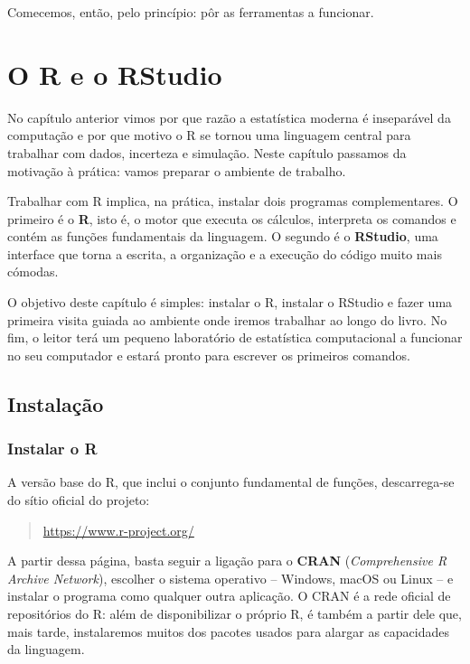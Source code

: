 \documentclass[
  portuguese,
  11pt,
  openany]{book}
\begin{document}
Comecemos, então, pelo princípio: pôr as ferramentas a funcionar.

\chapter{O R e o RStudio}\label{rrstudio}

No capítulo anterior vimos por que razão a estatística moderna é inseparável da computação e por que motivo o R se tornou uma linguagem central para trabalhar com dados, incerteza e simulação. Neste capítulo passamos da motivação à prática: vamos preparar o ambiente de trabalho.

Trabalhar com R implica, na prática, instalar dois programas complementares. O primeiro é o \textbf{R}, isto é, o motor que executa os cálculos, interpreta os comandos e contém as funções fundamentais da linguagem. O segundo é o \textbf{RStudio}, uma interface que torna a escrita, a organização e a execução do código muito mais cómodas.

O objetivo deste capítulo é simples: instalar o R, instalar o RStudio e fazer uma primeira visita guiada ao ambiente onde iremos trabalhar ao longo do livro. No fim, o leitor terá um pequeno laboratório de estatística computacional a funcionar no seu computador e estará pronto para escrever os primeiros comandos.

\section{Instalação}\label{instalauxe7uxe3o}

\subsection{Instalar o R}\label{instalar-o-r}

A versão base do R, que inclui o conjunto fundamental de funções, descarrega-se do sítio oficial do projeto:

\begin{quote}
\url{https://www.r-project.org/}
\end{quote}

A partir dessa página, basta seguir a ligação para o \textbf{CRAN} (\emph{Comprehensive R Archive Network}), escolher o sistema operativo -- Windows, macOS ou Linux -- e instalar o programa como qualquer outra aplicação. O CRAN é a rede oficial de repositórios do R: além de disponibilizar o próprio R, é também a partir dele que, mais tarde, instalaremos muitos dos pacotes usados para alargar as capacidades da linguagem.
\end{document}
